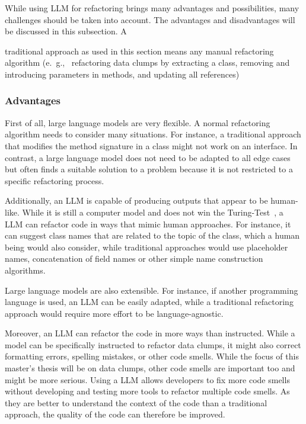 While using  \ac{LLM} for refactoring brings many advantages  and possibilities, many challenges should be taken into account. The advantages and disadvantages will be discussed in this subsection. A {traditional approach as used in this section means any manual refactoring algorithm (e.~g.,~ refactoring data clumps by extracting a class, removing and introducing parameters in methods, and updating all references)

\subsubsection{Advantages}

First of all, large language models are very flexible. A normal refactoring algorithm needs to consider many situations. For instance, a traditional approach that modifies the method signature in a class might not work on an interface. In contrast, a large language model does not need to be adapted to all edge cases but often finds a suitable solution to a problem because it is not restricted to a specific refactoring process.~\cite{shirafuji2023refactoring}

Additionally, an \ac{LLM} is capable of producing outputs that appear to be human-like. While it is still a computer model and does not win the Turing-Test~\cite{turing_test}, a \ac{LLM} can refactor code in ways that mimic human approaches. For instance, it can suggest class names that are related to the topic of the class, which a human being would also consider, while traditional approaches would use placeholder names, concatenation of field names or other simple name construction algorithms.~\cite{shirafuji2023refactoring}

Large language models are also extensible. For instance, if another programming language is used, an \ac{LLM} can be easily adapted, while a traditional refactoring approach would require more effort to be language-agnostic.

Moreover, an \ac{LLM} can refactor the code in more ways than instructed. While a model can be specifically instructed to refactor data clumps, it might also correct formatting errors, spelling mistakes, or other code smells. While the focus of this master's thesis will be on data clumps, other code smells are important too and might be more serious. Using a  \ac{LLM} allows developers to fix more code smells without developing and testing more tools to refactor multiple code smells. As they are better to understand the context of the code than a traditional approach, the quality of the code can therefore be improved.~\cite{shirafuji2023refactoring}

}
